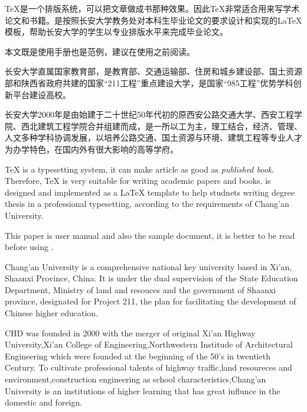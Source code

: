 \begin{cabstract}
\TeX{}是一个排版系统，可以把文章做成书那种效果。因此\TeX{}非常适合用来写学术论文和书籍。\chdpaper{}是按照长安大学教务处对本科生毕业论文的要求设计和实现的\LaTeX{}模板，帮助长安大学的学生以专业排版水平来完成毕业论文。

本文既是\chdpaper{}使用手册也是范例，建议在使用\chdpaper{}之前阅读。

长安大学直属国家教育部，是教育部、交通运输部、住房和城乡建设部、国土资源部和陕西省政府共建的国家“211工程”重点建设大学，是国家“985工程”优势学科创新平台建设高校。

长安大学2000年是由始建于二十世纪50年代初的原西安公路交通大学、西安工程学院、西北建筑工程学院合并组建而成，是一所以工为主，理工结合，经济、管理、人文多种学科协调发展，以培养公路交通、国土资源与环境、建筑工程等专业人才为办学特色，在国内外有很大影响的高等学府。
\end{cabstract}
\newpage
\begin{eabstract}
\TeX{} is a typesetting system, it can make article as good as {\em published book}. Therefore, \TeX{} is very suitable for writing academic papers and books. \chdpaper{}is designed and implemented as a \LaTeX{} template to help studnets writing degree thesis in a professional typesetting, according to the requirements of Chang'an University.

This paper is \chdpaper{}user manual and also the sample document, it is better to be read before using \chdpaper{}.

Chang'an  University is a comprehensive national key university based in Xi'an, %
Shaanxi Province, China. It is under the dual supervision of the State Education Department, Ministry of land and resouces and the government of Shaanxi province, designated for Project 211, %
the plan for facilitating the development of Chinese higher education. %

CHD was founded in 2000 with the merger of original Xi'an Highway University,Xi'an College of Engineering,Northwestern Institude of Architectural Engineering which were founded at the beginning of the 50's in twentieth Century. %
To cultivate professional talents of highway traffic,land resoureces and environment,construction engineering as school characteristics,Chang'an  University is an institutions of higher learning that has great influnce in the domestic and foreign.
\end{eabstract}
\newpage